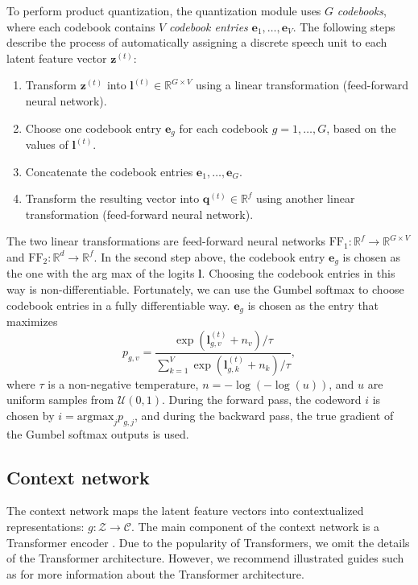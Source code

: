 To perform product quantization, the quantization module uses $G$ \emph{codebooks}, where each codebook contains $V$ \emph{codebook entries} $\mathbf{e}_{1}, \dots, \mathbf{e}_{V}$.
The following steps describe the process of automatically assigning a discrete speech unit to each latent feature vector $\mathbf{z}^{(t)}$:
\begin{enumerate}
    \item Transform $\mathbf{z}^{(t)}$ into $\mathbf{l}^{(t)} \in \mathbb{R}^{G \times V}$ using a linear transformation (feed-forward neural network).
    \item Choose one codebook entry $\mathbf{e}_g$ for each codebook $g = 1, \dots, G$, based on the values of $\mathbf{l}^{(t)}$.
    \item Concatenate the codebook entries $\mathbf{e}_1, \dots, \mathbf{e}_G$.
    \item Transform the resulting vector into $\mathbf{q}^{(t)} \in \mathbb{R}^{f}$ using another linear transformation (feed-forward neural network).
\end{enumerate}
The two linear transformations are feed-forward neural networks $\text{FF}_1: \mathbb{R}^{f} \rightarrow \mathbb{R}^{G \times V}$ and $\text{FF}_2: \mathbb{R}^{d} \rightarrow \mathbb{R}^{f}$.
In the second step above, the codebook entry $\mathbf{e}_g$ is chosen as the one with the arg max of the logits $\mathbf{l}$. Choosing the codebook entries in this way is non-differentiable.
Fortunately, we can use the Gumbel softmax to choose codebook entries in a fully differentiable way. 
$\mathbf{e}_g$ is chosen as the entry that maximizes
\begin{equation}
    p_{g, v} = \dfrac{\exp{\left(\mathbf{l}^{(t)}_{g, v} + n_v\right)}/\tau}{\sum\limits_{k=1}^{V} \exp{\left(\mathbf{l}^{(t)}_{g, k} + n_k\right)}/\tau},
\end{equation}
where $\tau$ is a non-negative temperature, $n = -\log{(-\log{(u)})}$, and $u$ are uniform samples from $\mathcal{U}(0, 1)$.
During the forward pass, the codeword $i$ is chosen by $i = \text{argmax}_j p_{g,j}$, and during the backward pass, the true gradient of the Gumbel softmax outputs is used.

\subsection{Context network}
The context network maps the latent feature vectors into contextualized representations: $g: \mathcal{Z} \rightarrow \mathcal{C}$.
The main component of the context network is a Transformer encoder \cite{transformer}.
Due to the popularity of Transformers, we omit the details of the Transformer architecture.
However, we recommend illustrated guides such as \cite{alammar2018illustrated} for more information about the Transformer architecture.

